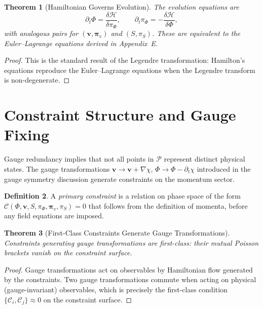 \documentclass[12pt,a4paper,openany]{book}
\theoremstyle{plain}
\newtheorem{theorem}{Theorem}[chapter]
\theoremstyle{definition}
\newtheorem{definition}[theorem]{Definition}
\theoremstyle{remark}
\begin{document}
\begin{theorem}[Hamiltonian Governs Evolution]
\label{thm:hamiltonian_evolution}
The evolution equations are
\[
\partial_t\Phi = \frac{\delta\mathcal{H}}{\delta\pi_\Phi}, \qquad \partial_t\pi_\Phi = -\frac{\delta\mathcal{H}}{\delta\Phi},
\]
with analogous pairs for $(\mathbf{v},\boldsymbol{\pi}_v)$ and $(S,\pi_S)$. These are equivalent to the Euler--Lagrange equations derived in Appendix~E.
\end{theorem}

\begin{proof}
This is the standard result of the Legendre transformation: Hamilton's equations reproduce the Euler--Lagrange equations when the Legendre transform is non-degenerate.
\end{proof}

\section{Constraint Structure and Gauge Fixing}

Gauge redundancy implies that not all points in $\mathcal{P}$ represent distinct physical states. The gauge transformations $\mathbf{v} \to \mathbf{v} + \nabla\chi$, $\Phi \to \Phi - \partial_t\chi$ introduced in the gauge symmetry discussion generate constraints on the momentum sector.

\begin{definition}
A \emph{primary constraint} is a relation on phase space of the form $\mathcal{C}(\Phi,\mathbf{v},S,\pi_\Phi,\boldsymbol{\pi}_v,\pi_S) = 0$ that follows from the definition of momenta, before any field equations are imposed.
\end{definition}

\begin{theorem}[First-Class Constraints Generate Gauge Transformations]
\label{thm:firstclass}
Constraints generating gauge transformations are first-class: their mutual Poisson brackets vanish on the constraint surface.
\end{theorem}

\begin{proof}
Gauge transformations act on observables by Hamiltonian flow generated by the constraints. Two gauge transformations commute when acting on physical (gauge-invariant) observables, which is precisely the first-class condition $\{\mathcal{C}_i,\mathcal{C}_j\} \approx 0$ on the constraint surface.
\end{proof}
\end{document}
